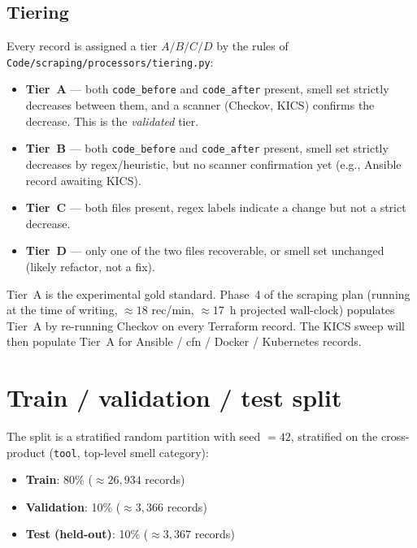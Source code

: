 \documentclass[12pt, a4paper]{report}
\begin{document}
\subsection{Tiering}

Every record is assigned a tier $A/B/C/D$ by the rules of
\texttt{Code/scraping/processors/tiering.py}:

\begin{itemize}
  \item \textbf{Tier~A} --- both \texttt{code\_before} and
        \texttt{code\_after} present, smell set strictly decreases between
        them, and a scanner (Checkov, KICS) confirms the decrease. This
        is the \emph{validated} tier.
  \item \textbf{Tier~B} --- both \texttt{code\_before} and
        \texttt{code\_after} present, smell set strictly decreases by
        regex/heuristic, but no scanner confirmation yet (e.g., Ansible
        record awaiting KICS).
  \item \textbf{Tier~C} --- both files present, regex labels indicate a
        change but not a strict decrease.
  \item \textbf{Tier~D} --- only one of the two files recoverable, or
        smell set unchanged (likely refactor, not a fix).
\end{itemize}

Tier~A is the experimental gold standard. Phase~4 of the scraping plan
(running at the time of writing, $\approx 18$ rec/min, $\approx 17$~h
projected wall-clock) populates Tier~A by re-running Checkov on every
Terraform record. The KICS sweep will then populate Tier~A for Ansible /
\gls{cfn} / Docker / Kubernetes records.

\section{Train / validation / test split}
\label{sec:split}

The split is a stratified random partition with seed $=42$, stratified on
the cross-product (\texttt{tool}, top-level smell category):

\begin{itemize}
  \item \textbf{Train}: 80\% ($\approx 26{,}934$ records)
  \item \textbf{Validation}: 10\% ($\approx 3{,}366$ records)
  \item \textbf{Test (held-out)}: 10\% ($\approx 3{,}367$ records)
\end{itemize}
\end{document}
